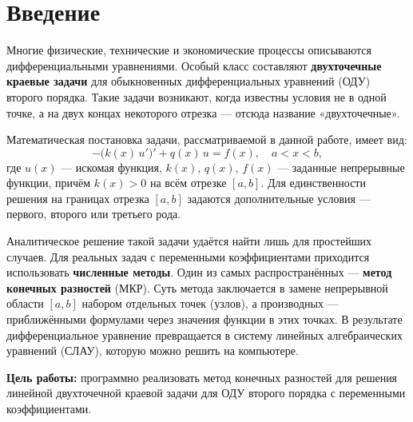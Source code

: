 \documentclass[14pt,a4paper]{extarticle}  %
\numberwithin{equation}{section}
\begin{document}
\tableofcontents
\newpage

\section*{Введение}

Многие физические, технические и экономические процессы описываются дифференциальными уравнениями. Особый класс составляют \textbf{двухточечные краевые задачи} для обыкновенных дифференциальных уравнений (ОДУ) второго порядка. Такие задачи возникают, когда известны условия не в одной точке, а на двух концах некоторого отрезка — отсюда название «двухточечные».

Математическая постановка задачи, рассматриваемой в данной работе, имеет вид:
\begin{equation*}
    -\bigl(k(x)\,u'\bigr)' + q(x)\,u = f(x), \quad a < x < b,
\end{equation*}
где $u(x)$ — искомая функция, $k(x)$, $q(x)$, $f(x)$ — заданные непрерывные функции, причём $k(x) > 0$ на всём отрезке $[a, b]$. Для единственности решения на границах отрезка $[a, b]$ задаются дополнительные условия — первого, второго или третьего рода.

Аналитическое решение такой задачи удаётся найти лишь для простейших случаев. Для реальных задач с переменными коэффициентами приходится использовать \textbf{численные методы}. Один из самых распространённых — \textbf{метод конечных разностей} (МКР). Суть метода заключается в замене непрерывной области $[a, b]$ набором отдельных точек (узлов), а производных — приближёнными формулами через значения функции в этих точках. В результате дифференциальное уравнение превращается в систему линейных алгебраических уравнений (СЛАУ), которую можно решить на компьютере.

\textbf{Цель работы:} программно реализовать метод конечных разностей для решения линейной двухточечной краевой задачи для ОДУ второго порядка с переменными коэффициентами.
\end{document}
